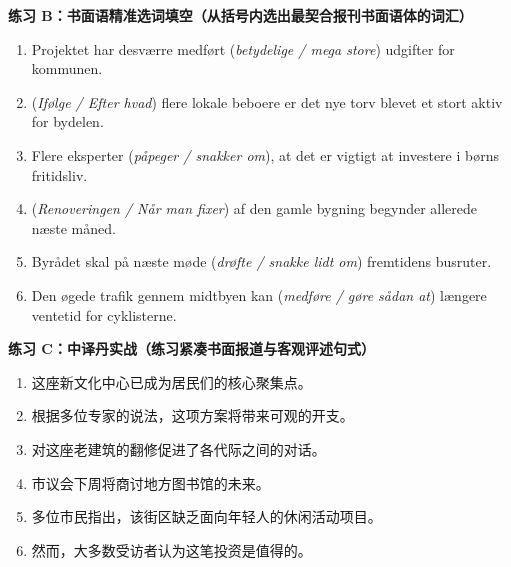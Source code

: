 \textbf{练习 B：书面语精准选词填空（从括号内选出最契合报刊书面语体的词汇）}
\begin{enumerate}
  \item Projektet har desværre medført \underline{\hspace{2.2cm}} (\textit{betydelige / mega store}) udgifter for kommunen.
  \item \underline{\hspace{2.2cm}} (\textit{Ifølge / Efter hvad}) flere lokale beboere er det nye torv blevet et stort aktiv for bydelen.
  \item Flere eksperter \underline{\hspace{2.2cm}} (\textit{påpeger / snakker om}), at det er vigtigt at investere i børns fritidsliv.
  \item \underline{\hspace{2.2cm}} (\textit{Renoveringen / Når man fixer}) af den gamle bygning begynder allerede næste måned.
  \item Byrådet skal på næste møde \underline{\hspace{2.2cm}} (\textit{drøfte / snakke lidt om}) fremtidens busruter.
  \item Den øgede trafik gennem midtbyen kan \underline{\hspace{2.2cm}} (\textit{medføre / gøre sådan at}) længere ventetid for cyklisterne.
\end{enumerate}

\textbf{练习 C：中译丹实战（练习紧凑书面报道与客观评述句式）}
\begin{enumerate}
  \item 这座新文化中心已成为居民们的核心聚集点。
  \item 根据多位专家的说法，这项方案将带来可观的开支。
  \item 对这座老建筑的翻修促进了各代际之间的对话。
  \item 市议会下周将商讨地方图书馆的未来。
  \item 多位市民指出，该街区缺乏面向年轻人的休闲活动项目。
  \item 然而，大多数受访者认为这笔投资是值得的。
\end{enumerate}


